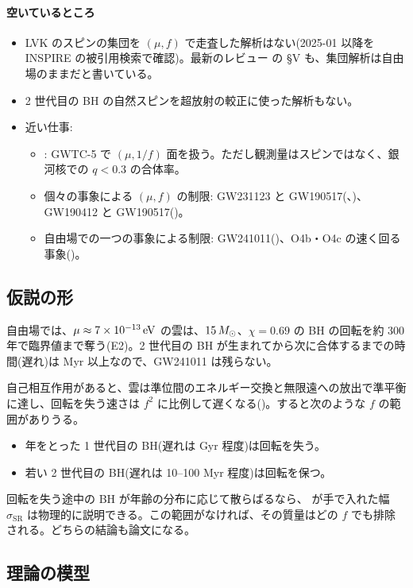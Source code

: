 \paragraph{空いているところ}
\begin{itemize}
\item LVK のスピンの集団を $(\mu,f)$ で走査した解析はない(2025-01 以降を INSPIRE の被引用検索で確認)。最新のレビュー  の \S V も、集団解析は自由場のままだと書いている。
\item 2 世代目の BH の自然スピンを超放射の較正に使った解析もない。
\item 近い仕事:
  \begin{itemize}
  \item {}: GWTC-5 で $(\mu,1/f)$ 面を扱う。ただし観測量はスピンではなく、銀河核での $q<0.3$ の合体率。
  \item 個々の事象による $(\mu,f)$ の制限: GW231123 と GW190517(、)、GW190412 と GW190517()。
  \item 自由場での一つの事象による制限: GW241011()、O4b・O4c の速く回る事象()。
  \end{itemize}
\end{itemize}

\subsection{仮説の形}

自由場では、$\mu\approx7\times10^{-13}\,\mathrm{eV}$ の雲は、$15\,M_\odot$、$\chi=0.69$ の BH の回転を約 300 年で臨界値まで奪う(E2)。2 世代目の BH が生まれてから次に合体するまでの時間(遅れ)は Myr 以上なので、GW241011 は残らない。

自己相互作用があると、雲は準位間のエネルギー交換と無限遠への放出で準平衡に達し、回転を失う速さは $f^2$ に比例して遅くなる()。すると次のような $f$ の範囲がありうる。
\begin{itemize}
\item 年をとった 1 世代目の BH(遅れは Gyr 程度)は回転を失う。
\item 若い 2 世代目の BH(遅れは 10--100 Myr 程度)は回転を保つ。
\end{itemize}
回転を失う途中の BH が年齢の分布に応じて散らばるなら、 が手で入れた幅 $\sigma_\mathrm{SR}$ は物理的に説明できる。この範囲がなければ、その質量はどの $f$ でも排除される。どちらの結論も論文になる。

\subsection{理論の模型}

